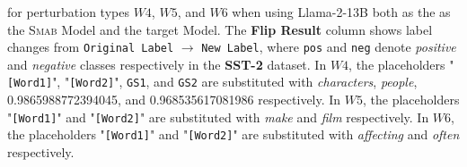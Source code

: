 \begin{table*}[htbp]
{for perturbation types $W4$, $W5$, and $W6$ when using Llama-2-13B both as the as the \textsc{Smab} Model and the target Model. The \textbf{Flip Result} column shows label changes from \texttt{Original Label} $\rightarrow$ \texttt{New Label}, where \texttt{pos} and \texttt{neg} denote \textit{positive} and \textit{negative} classes respectively in the \textbf{SST-2} dataset. In $W4$, the placeholders "\texttt{[Word1]}", "\texttt{[Word2]}", \texttt{GS1}, and \texttt{GS2} are substituted with \textit{characters}, \textit{people}, 0.9865988772394045, and 0.968535617081986 respectively. In $W5$, the placeholders "\texttt{[Word1]}" and "\texttt{[Word2]}" are substituted with \textit{make} and \textit{film} respectively. In $W6$, the placeholders "\texttt{[Word1]}" and "\texttt{[Word2]}" are substituted with \textit{affecting} and \textit{often} respectively.}
\label{tab:Qual_Examples_promptAttack}
\end{table*}

\clearpage

